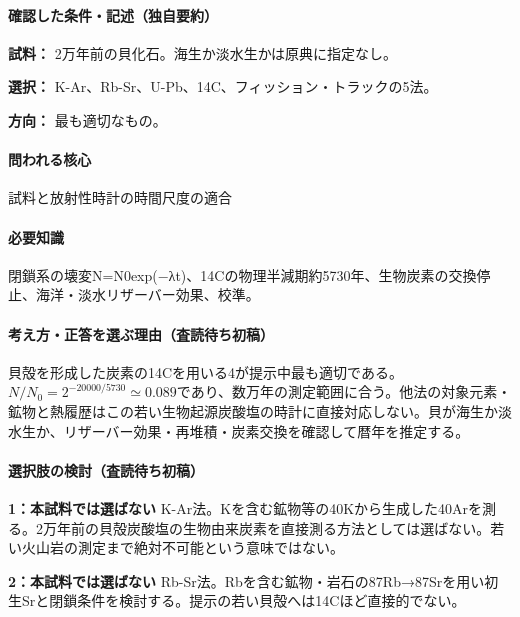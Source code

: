 \paragraph{確認した条件・記述（独自要約）}\mbox{}\par

\noindent\textbf{試料：} 2万年前の貝化石。海生か淡水生かは原典に指定なし。\par

\noindent\textbf{選択：} K-Ar、Rb-Sr、U-Pb、14C、フィッション・トラックの5法。\par

\noindent\textbf{方向：} 最も適切なもの。\par

\paragraph{問われる核心} 試料と放射性時計の時間尺度の適合

\paragraph{必要知識} 閉鎖系の壊変N=\allowbreak{}N0exp(−λt)、14Cの物理半減期約5730年、生物炭素の交換停止、海洋・淡水リザーバー効果、校準。

\paragraph{考え方・正答を選ぶ理由（査読待ち初稿）} 貝殻を形成した炭素の14Cを用いる4が提示中最も適切である。\(N/N_0=2^{-20000/5730}\simeq0.089\)であり、数万年の測定範囲に合う。他法の対象元素・鉱物と熱履歴はこの若い生物起源炭酸塩の時計に直接対応しない。貝が海生か淡水生か、リザーバー効果・再堆積・炭素交換を確認して暦年を推定する。

\paragraph{選択肢の検討（査読待ち初稿）}\mbox{}\par

\noindent\textbf{1：本試料では選ばない} K-Ar法。Kを含む鉱物等の40Kから生成した40Arを測る。2万年前の貝殻炭酸塩の生物由来炭素を直接測る方法としては選ばない。若い火山岩の測定まで絶対不可能という意味ではない。\par

\noindent\textbf{2：本試料では選ばない} Rb-Sr法。Rbを含む鉱物・岩石の87Rb→87Srを用い初生Srと閉鎖条件を検討する。提示の若い貝殻へは14Cほど直接的でない。\par


